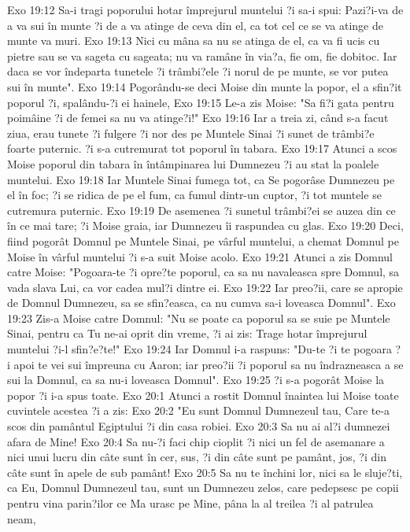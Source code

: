 Exo 19:12  Sa-i tragi poporului hotar împrejurul muntelui ?i sa-i spui: Pazi?i-va de a va sui în munte ?i de a va atinge de ceva din el, ca tot cel ce se va atinge de munte va muri.
Exo 19:13  Nici cu mâna sa nu se atinga de el, ca va fi ucis cu pietre sau se va sageta cu sageata; nu va ramâne în via?a, fie om, fie dobitoc. Iar daca se vor îndeparta tunetele ?i trâmbi?ele ?i norul de pe munte, se vor putea sui în munte".
Exo 19:14  Pogorându-se deci Moise din munte la popor, el a sfin?it poporul ?i, spalându-?i ei hainele,
Exo 19:15  Le-a zis Moise: "Sa fi?i gata pentru poimâine ?i de femei sa nu va atinge?i!"
Exo 19:16  Iar a treia zi, când s-a facut ziua, erau tunete ?i fulgere ?i nor des pe Muntele Sinai ?i sunet de trâmbi?e foarte puternic. ?i s-a cutremurat tot poporul în tabara.
Exo 19:17  Atunci a scos Moise poporul din tabara în întâmpinarea lui Dumnezeu ?i au stat la poalele muntelui.
Exo 19:18  Iar Muntele Sinai fumega tot, ca Se pogorâse Dumnezeu pe el în foc; ?i se ridica de pe el fum, ca fumul dintr-un cuptor, ?i tot muntele se cutremura puternic.
Exo 19:19  De asemenea ?i sunetul trâmbi?ei se auzea din ce în ce mai tare; ?i Moise graia, iar Dumnezeu îi raspundea cu glas.
Exo 19:20  Deci, fiind pogorât Domnul pe Muntele Sinai, pe vârful muntelui, a chemat Domnul pe Moise în vârful muntelui ?i s-a suit Moise acolo.
Exo 19:21  Atunci a zis Domnul catre Moise: "Pogoara-te ?i opre?te poporul, ca sa nu navaleasca spre Domnul, sa vada slava Lui, ca vor cadea mul?i dintre ei.
Exo 19:22  Iar preo?ii, care se apropie de Domnul Dumnezeu, sa se sfin?easca, ca nu cumva sa-i loveasca Domnul".
Exo 19:23  Zis-a Moise catre Domnul: "Nu se poate ca poporul sa se suie pe Muntele Sinai, pentru ca Tu ne-ai oprit din vreme, ?i ai zis: Trage hotar împrejurul muntelui ?i-l sfin?e?te!"
Exo 19:24  Iar Domnul i-a raspuns: "Du-te ?i te pogoara ?i apoi te vei sui împreuna cu Aaron; iar preo?ii ?i poporul sa nu îndrazneasca a se sui la Domnul, ca sa nu-i loveasca Domnul".
Exo 19:25  ?i s-a pogorât Moise la popor ?i i-a spus toate.
Exo 20:1  Atunci a rostit Domnul înaintea lui Moise toate cuvintele acestea ?i a zis:
Exo 20:2  "Eu sunt Domnul Dumnezeul tau, Care te-a scos din pamântul Egiptului ?i din casa robiei.
Exo 20:3  Sa nu ai al?i dumnezei afara de Mine!
Exo 20:4  Sa nu-?i faci chip cioplit ?i nici un fel de asemanare a nici unui lucru din câte sunt în cer, sus, ?i din câte sunt pe pamânt, jos, ?i din câte sunt în apele de sub pamânt!
Exo 20:5  Sa nu te închini lor, nici sa le sluje?ti, ca Eu, Domnul Dumnezeul tau, sunt un Dumnezeu zelos, care pedepsesc pe copii pentru vina parin?ilor ce Ma urasc pe Mine, pâna la al treilea ?i al patrulea neam,
